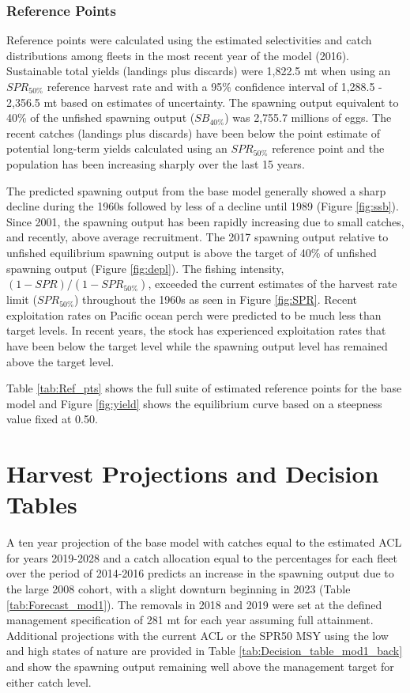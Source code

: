 \documentclass[12pt,]{article}
\begin{document}
\subsubsection{Reference Points}\label{reference-points-1}

Reference points were calculated using the estimated selectivities and
catch distributions among fleets in the most recent year of the model
(2016). Sustainable total yields (landings plus discards) were 1,822.5
mt when using an \(SPR_{50\%}\) reference harvest rate and with a 95\%
confidence interval of 1,288.5 - 2,356.5 mt based on estimates of
uncertainty. The spawning output equivalent to 40\% of the unfished
spawning output (\(SB_{40\%}\)) was 2,755.7 millions of eggs. The recent
catches (landings plus discards) have been below the point estimate of
potential long-term yields calculated using an \(SPR_{50\%}\) reference
point and the population has been increasing sharply over the last 15
years.

The predicted spawning output from the base model generally showed a
sharp decline during the 1960s followed by less of a decline until 1989
(Figure \ref{fig:ssb}). Since 2001, the spawning output has been rapidly
increasing due to small catches, and recently, above average
recruitment. The 2017 spawning output relative to unfished equilibrium
spawning output is above the target of 40\% of unfished spawning output
(Figure \ref{fig:depl}). The fishing intensity,
\((1-SPR)/(1-SPR_{50\%})\), exceeded the current estimates of the
harvest rate limit (\(SPR_{50\%}\)) throughout the 1960s as seen in
Figure \ref{fig:SPR}. Recent exploitation rates on Pacific ocean perch
were predicted to be much less than target levels. In recent years, the
stock has experienced exploitation rates that have been below the target
level while the spawning output level has remained above the target
level.

Table \ref{tab:Ref_pts} shows the full suite of estimated reference
points for the base model and Figure \ref{fig:yield} shows the
equilibrium curve based on a steepness value fixed at 0.50.

\section{Harvest Projections and Decision
Tables}\label{harvest-projections-and-decision-tables}

A ten year projection of the base model with catches equal to the
estimated ACL for years 2019-2028 and a catch allocation equal to the
percentages for each fleet over the period of 2014-2016 predicts an
increase in the spawning output due to the large 2008 cohort, with a
slight downturn beginning in 2023 (Table \ref{tab:Forecast_mod1}). The
removals in 2018 and 2019 were set at the defined management
specification of 281 mt for each year assuming full attainment.
Additional projections with the current ACL or the SPR50 MSY using the
low and high states of nature are provided in Table
\ref{tab:Decision_table_mod1_back} and show the spawning output
remaining well above the management target for either catch level.
\end{document}
